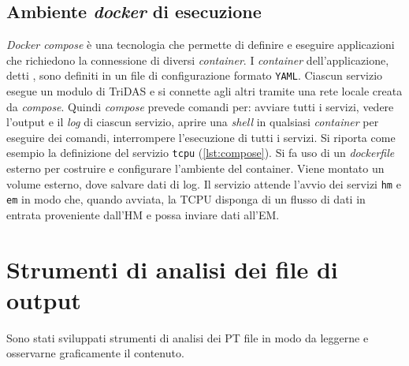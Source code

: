 \documentclass[../main.tex]{subfiles}
\begin{document}
\subsection{Ambiente \emph{docker} di esecuzione}
\emph{Docker compose} è una tecnologia che permette di definire e eseguire applicazioni che richiedono la connessione di diversi \emph{container}. I \emph{container} dell'applicazione, detti , sono definiti in un file di configurazione formato \texttt{YAML}. Ciascun servizio esegue un modulo di TriDAS e si connette agli altri tramite una rete locale creata da \emph{compose}. Quindi \emph{compose} prevede comandi per: avviare tutti i servizi, vedere l'output e il \emph{log} di ciascun servizio, aprire una \emph{shell} in qualsiasi \emph{container} per eseguire dei comandi, interrompere l'esecuzione di tutti i servizi.  
Si riporta come esempio la definizione del servizio \texttt{tcpu} (\autoref{lst:compose}). Si fa uso di un \emph{dockerfile} esterno per costruire e configurare l'ambiente del container. Viene montato un volume esterno, dove salvare dati di log. Il servizio attende l'avvio dei servizi \texttt{hm} e \texttt{em} in modo che, quando avviata, la TCPU disponga di un flusso di dati in entrata proveniente dall'HM e possa inviare dati all'EM. 

\section{Strumenti di analisi dei file di output}
Sono stati sviluppati strumenti di analisi dei PT file in modo da leggerne e osservarne graficamente il contenuto.
\end{document}
